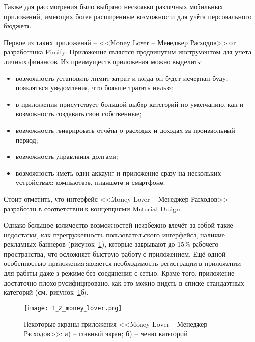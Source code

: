 Также для рассмотрения было выбрано несколько различных мобильных приложений, имеющих более расширенные возможности для учёта персонального бюджета.

Первое из таких приложений -- <<Money Lover -- Менеджер Расходов>> от разработчика Finsify.
Приложение является продвинутым инструментом для учета личных финансов.
Из преимуществ приложения можно выделить:
\begin{itemize}
    \item возможность установить лимит затрат и когда он будет исчерпан будут появляться уведомления, что больше тратить нельзя;
    \item в приложении присутствует большой выбор категорий по умолчанию, как и возможность создавать свои собственные;
    \item возможность генерировать отчёты о расходах и доходах за произвольный период;
    \item возможность управления долгами;
    \item возможность иметь один аккаунт и приложение сразу на нескольких устройствах: компьютере, планшете и смартфоне.
\end{itemize}

Стоит отметить, что интерфейс <<Money Lover -- Менеджер Расходов>> разработан в соответствии к концепциями Material Design.

Однако большое количество возможностей неизбежно влечёт за собой такие недостатки, как перегруженность пользовательского интерфейса, наличие рекламных баннеров (рисунок~\ref{fig:analysis:analogues:money_lover}), которые закрывают до 15\% рабочего пространства, что осложняет быструю работу с приложением.
Ещё одной особенностью приложения является необходимость регистрации в приложении для работы даже в режиме без соединения с сетью.
Кроме того, приложение достаточно плохо русифицировано, как это можно видеть в списке стандартных категорий (см. рисунок~\ref{fig:analysis:analogues:money_lover}б).

\begin{figure}
    \centering
    \texttt{[image: 1\_2\_money\_lover.png]}
    \caption{Некоторые экраны приложения <<Money Lover -- Менеджер Расходов>>: а) -- главный экран; б) -- меню категорий}
    \label{fig:analysis:analogues:money_lover}
\end{figure}


